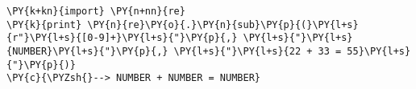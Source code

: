 \begin{Verbatim}[commandchars=\\\{\}]
\PY{k+kn}{import} \PY{n+nn}{re}
\PY{k}{print} \PY{n}{re}\PY{o}{.}\PY{n}{sub}\PY{p}{(}\PY{l+s}{r"}\PY{l+s}{[0-9]+}\PY{l+s}{"}\PY{p}{,} \PY{l+s}{"}\PY{l+s}{NUMBER}\PY{l+s}{"}\PY{p}{,} \PY{l+s}{"}\PY{l+s}{22 + 33 = 55}\PY{l+s}{"}\PY{p}{)} 
\PY{c}{\PYZsh{}--> NUMBER + NUMBER = NUMBER}
\end{Verbatim}
